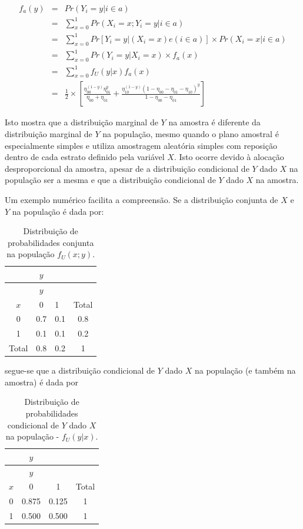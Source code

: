 \documentclass[]{book}
\theoremstyle{definition}
\theoremstyle{definition}
\theoremstyle{definition}
\theoremstyle{remark}
\begin{document}
\begin{eqnarray}
 f_a (y) &= &Pr( Y_i = y | i \in a )\\ 
&=& \sum _{x = 0} ^{1} Pr( X_i = x ; Y_i = y | i \in a) \nonumber \\ 
&=& \sum _{x = 0} ^{1} Pr[ Y_i = y | (X_i = x) e (i \in a)] \times Pr( X_i = x | i \in a) \nonumber\\ 
&=& \sum _{x = 0} ^{1} Pr( Y_i = y | X_i = x) \times f_a (x) \nonumber \\ 
&=& \sum _{x = 0} ^{1} f_U ( y | x) f_a (x) \nonumber \\ 
&=& \frac{1}{2} \times \left[ \frac{\eta_{00}^{(1-y)} \eta_{01}^y} {\eta_{00}+\eta_{01}}+ \frac{\eta_{10}^{(1-y)} (1 - \eta_{00} - \eta_{01} - \eta_{10})^y} {1 - \eta_{00} - \eta_{01}} \right]\nonumber
\end{eqnarray}

Isto mostra que a distribuição marginal de \(Y\) na amostra é diferente
da distribuição marginal de \(Y\) na população, mesmo quando o plano
amostral é especialmente simples e utiliza amostragem aleatória simples
com reposição dentro de cada estrato definido pela variável \(X\). Isto
ocorre devido à alocação desproporcional da amostra, apesar de a
distribuição condicional de \(Y\) dado \(X\) na população ser a mesma e
que a distribuição condicional de \(Y\) dado \(X\) na amostra.

Um exemplo numérico facilita a compreensão. Se a distribuição conjunta
de \(X\) e \(Y\) na população é dada por:

\begin{longtable}[]{@{}cclc@{}}
\caption{\label{tab:Tab26} Distribuição de probabilidades conjunta na
população \(f_U( x ; y )\).}\tabularnewline
\toprule
& \(y\) & &\tabularnewline
\midrule
\endfirsthead
\toprule
& \(y\) & &\tabularnewline
\midrule
\endhead
\(x\) & 0 & 1 & Total\tabularnewline
0 & 0.7 & 0.1 & 0.8\tabularnewline
1 & 0.1 & 0.1 & 0.2\tabularnewline
Total & 0.8 & 0.2 & 1\tabularnewline
\bottomrule
\end{longtable}

segue-se que a distribuição condicional de \(Y\) dado \(X\) na população
(e também na amostra) é dada por

\begin{longtable}[]{@{}cccc@{}}
\caption{\label{tab:Tab27} Distribuição de probabilidades condicional de
\(Y\) dado \(X\) na população - \(f_U( y | x )\).}\tabularnewline
\toprule
& \(y\) & &\tabularnewline
\midrule
\endfirsthead
\toprule
& \(y\) & &\tabularnewline
\midrule
\endhead
\(x\) & 0 & 1 & Total\tabularnewline
0 & 0.875 & 0.125 & 1\tabularnewline
1 & 0.500 & 0.500 & 1\tabularnewline
\bottomrule
\end{longtable}
\end{document}
